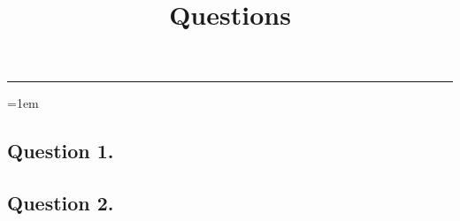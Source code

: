 \documentclass{mhk}
\title{Questions}
\begin{document}
\maketitle
\hrule
\vspace*{\baselineskip}
\emergencystretch=1em

%
% 
%






\subsection*{Question 1.}





\subsection*{Question 2.}







\end{document}
